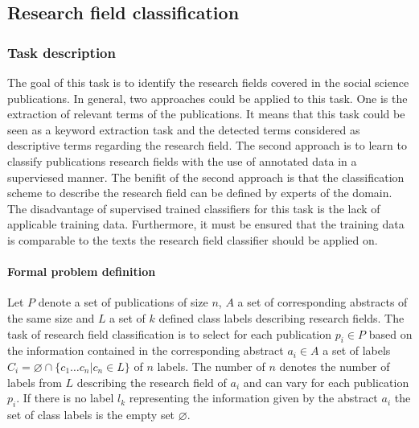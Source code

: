 
\subsection{Research field classification}
\label{sec:field_classification}
\subsubsection{Task description}
The goal of this task is to identify the research fields covered in the social science publications.
In general, two approaches could be applied to this task.
One is the extraction of relevant terms of the publications.
It means that this task could be seen as a keyword extraction task and the detected terms considered as descriptive terms regarding the research field.
The second approach is to learn to classify publications research fields with the use of annotated data in a superviesed manner.
The benifit of the second approach is that the classification scheme to describe the research field can be defined by experts of the domain.
The disadvantage of supervised trained classifiers for this task is the lack of applicable training data.
Furthermore, it must be ensured that the training data is comparable to the texts the research field classifier should be applied on.

\paragraph{Formal problem definition}
Let $P$ denote a set of publications of size $n$, $A$ a set of corresponding abstracts of the same size and $L$ a set of $k$ defined class labels describing research fields.
The task of research field classification is to select for each publication $p_i\in{P}$ based on the information contained in the corresponding abstract $a_i\in{A}$ a set of labels $C_i = \varnothing \cap \{c_1\dots c_n|c_n \in L\}$ of $n$ labels.
The number of $n$ denotes the number of labels from $L$ describing the research field of $a_i$ and can vary for each publication $p_i$.
If there is no label $l_k$ representing the information given by the abstract $a_i$ the set of class labels is the empty set $\varnothing$.



